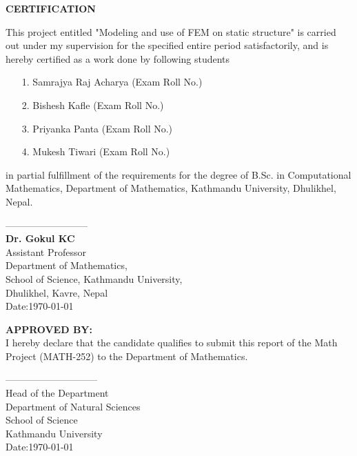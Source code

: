 



\begin{center}
	{\Large{\bf{ CERTIFICATION}}}
\end{center}


\noindent
This project entitled "Modeling and use of FEM on static structure" is carried out  under my supervision for the specified entire period satisfactorily, and is hereby certified as a work done by following students
\begin{itemize}
\item[1.] Samrajya Raj Acharya (Exam Roll No.)
\item[2.] Bishesh Kafle (Exam Roll No.)
\item[3.] Priyanka Panta (Exam Roll No.)
\item[4.] Mukesh Tiwari (Exam Roll No.)
\end{itemize}
 in partial fulfillment of the requirements for the degree of B.Sc. in Computational Mathematics, Department of Mathematics, Kathmandu University, Dhulikhel, Nepal.

\vspace{2.0cm}

\noindent
--------------------------\\
{\bf Dr. Gokul KC}\\
Assistant Professor \\
Department of Mathematics,\\
School of Science, Kathmandu University,\\
Dhulikhel, Kavre, Nepal\\
Date:\today

\vspace{2cm}

\noindent
{\bf APPROVED BY:}\\
I hereby declare that the candidate qualifies to submit this  report of the  Math Project (MATH-252) to the Department of Mathematics. 



\vspace{2cm}

\noindent
-----------------------------\\
Head of the Department\\
Department of Natural Sciences\\
School of Science\\
Kathmandu University\\
Date:\today
  